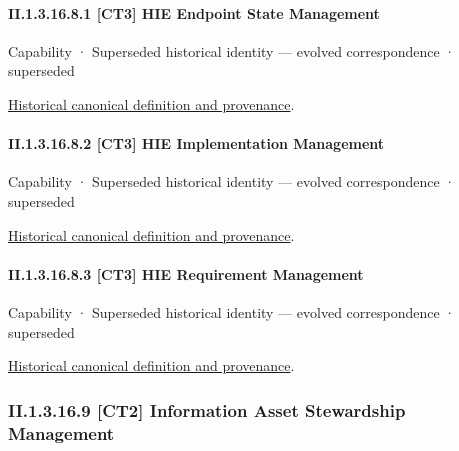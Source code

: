 \paragraph*{II.1.3.16.8.1 [CT3] HIE Endpoint State Management}
\label{navigation:II.1.3.16.8.1}

\label{element:697de08ac49a4b7f8df7a1ed6f04210e}
{\small Capability · Superseded historical identity — evolved correspondence · superseded}\par
\href{../../../../continuum/strategy/capability/697de08ac49a4b7f8df7a1ed6f04210e.md}{Historical canonical definition and provenance}.\par
\paragraph*{II.1.3.16.8.2 [CT3] HIE Implementation Management}
\label{navigation:II.1.3.16.8.2}

\label{element:a99b4119339545a89dc54ebb216ddb85}
{\small Capability · Superseded historical identity — evolved correspondence · superseded}\par
\href{../../../../continuum/strategy/capability/a99b4119339545a89dc54ebb216ddb85.md}{Historical canonical definition and provenance}.\par
\paragraph*{II.1.3.16.8.3 [CT3] HIE Requirement Management}
\label{navigation:II.1.3.16.8.3}

\label{element:a32c8bff0c284f5c9d6ab1f46991c232}
{\small Capability · Superseded historical identity — evolved correspondence · superseded}\par
\href{../../../../continuum/strategy/capability/a32c8bff0c284f5c9d6ab1f46991c232.md}{Historical canonical definition and provenance}.\par
\subsubsection*{II.1.3.16.9 [CT2] Information Asset Stewardship Management}
\label{navigation:II.1.3.16.9}

